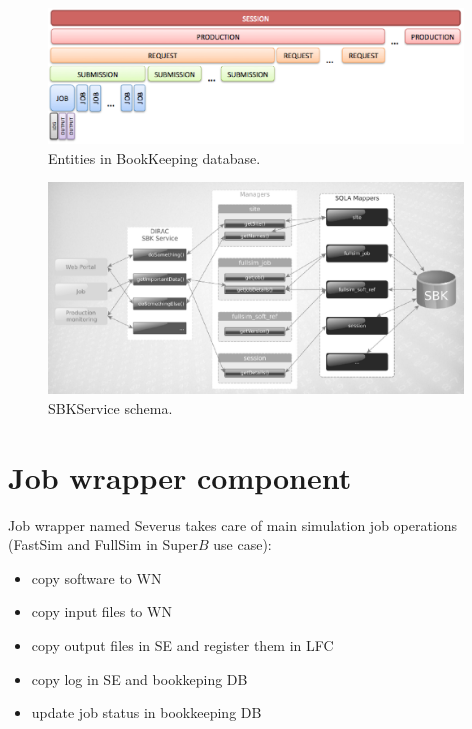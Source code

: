 \documentclass[a4paper]{jpconf}
\begin{document}
\begin{figure}[h]
\includegraphics[width=26pc]{img/BK_entities.eps}\hspace{2pc}%
\caption{\label{fig:BK_entities}Entities in BookKeeping database.}
\end{figure}

\begin{figure}[h]
\includegraphics[width=26pc]{img/SBKService.eps}\hspace{2pc}%
\caption{\label{fig:SBKService}SBKService schema.}
\end{figure}
 
\section{Job wrapper component}
\label{sec:severus}

Job wrapper named Severus takes care of main simulation job operations (FastSim and FullSim in Super$B$ use case):
\begin{itemize}
\item copy software to WN
\item copy input files to WN
\item copy output files in SE and register them in LFC
\item copy log in SE and bookkeping DB
\item update job status in bookkeeping DB
\end{itemize}
\end{document}
